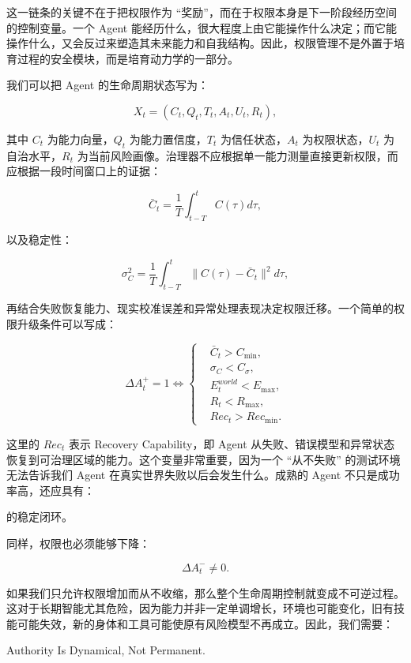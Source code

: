 这一链条的关键不在于把权限作为 ``奖励''，而在于权限本身是下一阶段经历空间的控制变量。一个 Agent 能经历什么，很大程度上由它能操作什么决定；而它能操作什么，又会反过来塑造其未来能力和自我结构。因此，权限管理不是外置于培育过程的安全模块，而是培育动力学的一部分。

我们可以把 Agent 的生命周期状态写为：

\[
X_t=
(C_t,Q_t,T_t,A_t,U_t,R_t),
\]

其中 $C_t$ 为能力向量，$Q_t$ 为能力置信度，$T_t$ 为信任状态，$A_t$ 为权限状态，$U_t$ 为自治水平，$R_t$ 为当前风险画像。治理器不应根据单一能力测量直接更新权限，而应根据一段时间窗口上的证据：

\[
\bar C_t
=
\frac{1}{T}
\int_{t-T}^{t}
C(\tau)d\tau ,
\]

以及稳定性：

\[
\sigma_C^2
=
\frac{1}{T}
\int_{t-T}^{t}
\|C(\tau)-\bar C_t\|^2d\tau ,
\]

再结合失败恢复能力、现实校准误差和异常处理表现决定权限迁移。一个简单的权限升级条件可以写成：

\[
\Delta A_t^{+}
=
1
\iff
\left\{
\begin{aligned}
&\bar C_t>C_{\min},\\
&\sigma_C<C_{\sigma},\\
&E^{world}_t<E_{\max},\\
&R_t<R_{\max},\\
&Rec_t>Rec_{\min}.
\end{aligned}
\right.
\]

这里的 $Rec_t$ 表示 Recovery Capability，即 Agent 从失败、错误模型和异常状态恢复到可治理区域的能力。这个变量非常重要，因为一个 ``从不失败'' 的测试环境无法告诉我们 Agent 在真实世界失败以后会发生什么。成熟的 Agent 不只是成功率高，还应具有：

\begin{statementbox}
\centering
{}
\end{statementbox}

的稳定闭环。

同样，权限也必须能够下降：

\[
\Delta A_t^{-}
\neq 0 .
\]

如果我们只允许权限增加而从不收缩，那么整个生命周期控制就变成不可逆过程。这对于长期智能尤其危险，因为能力并非一定单调增长，环境也可能变化，旧有技能可能失效，新的身体和工具可能使原有风险模型不再成立。因此，我们需要：

\begin{statementbox}
Authority Is Dynamical, Not Permanent.
\end{statementbox}

